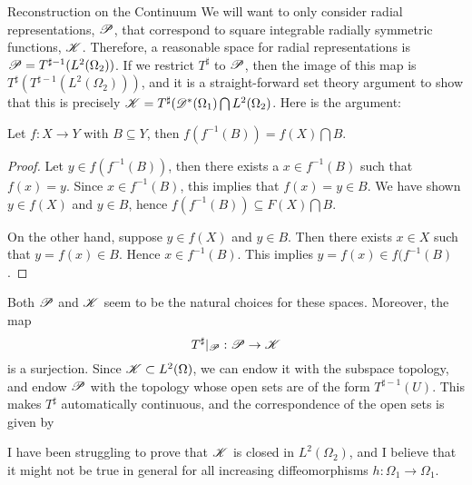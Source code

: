 \begin{chapter}{Reconstruction on the Continuum}
We will want to only consider radial representations, $\mathscr P$, that correspond to square integrable radially symmetric functions, $\mathscr K$.
Therefore, a reasonable space for radial representations is $\mathscr P = T^{\sharp-1}(L^2(\Omega_2))$. 
If we restrict $T^{\sharp}$ to $\mathscr P$, then the image of this map is $T^{\sharp} (T^{\sharp-1}(L^2(\Omega_2)))$, and it is a straight-forward set theory argument to show that this is precisely $\mathscr K = T^\sharp(\mathscr D^*(\Omega_1) \bigcap L^2(\Omega_2)$. 
Here is the argument:
\begin{prop}
  Let $f:X\to Y$ with $B \subseteq Y$, then $f (f^{-1} ( B )) = f(X) \bigcap B$. 
\end{prop}
\begin{proof}
Let $y \in f( f^{-1}(B))$, then there exists a $x \in f^{-1}(B)$ such that $f(x) = y$.  
Since $x \in f^{-1}(B)$, this implies that $f(x) = y \in B$. 
We have shown $y\in f(X)$ and $y \in B$, hence $f(f^{-1}(B)) \subseteq F(X)\bigcap B$.

On the other hand, suppose $y \in f(X)$ and $y \in B$.
Then there exists $x\in X$ such that $y = f(x) \in B$.  Hence $x \in f^{-1}(B)$.  This implies $y = f(x) \in f(f^{-1}(B)$.
\end{proof}

Both $\mathscr P$ and $\mathscr K$ seem to be the natural choices for these spaces.  
Moreover, the map
\begin{equation}
  T^\sharp|_{\mathscr P}:\mathscr P \to \mathscr K
\end{equation}
is a surjection.
Since $\mathscr K \subset L^2(\Omega)$, we can endow it with the subspace topology, and endow $\mathscr P$ with the topology whose open sets are of the form $T^{\sharp-1}(U)$.  
This makes $T^\sharp$ automatically continuous, and the correspondence of the open sets is given by 

I have been struggling to prove that $\mathscr K$ is closed in $L^2(\Omega_2)$, and I believe that it might not be true in general for all increasing diffeomorphisms $h:\Omega_1 \to \Omega_1$. 


\end{chapter}
